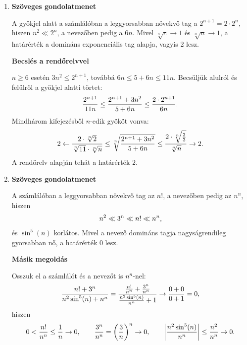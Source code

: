 \documentclass[11pt]{scrartcl}
\begin{document}
\begin{enumerate}
	\item \textbf{Szöveges gondolatmenet}

	      A gyökjel alatt a számlálóban a leggyorsabban növekvő tag a
	      $2^{n + 1} = 2 \cdot 2^n$, hiszen $n^2 \ll 2^n$, a nevezőben pedig a
	      $6n$. Mivel $\sqrt[n]{c} \to 1$ és $\sqrt[n]{n} \to 1$, a határérték a
	      domináns exponenciális tag alapja, vagyis $2$ lesz.

	      \textbf{Becslés a rendőrelvvel}

	      $n \ge 6$ esetén $3n^2 \le 2^{n + 1}$, továbbá
	      $6n \le 5 + 6n \le 11n$. Becsüljük alulról és felülről a gyökjel
	      alatti törtet:
	      \[
		      \frac{2^{n + 1}}{11n}
		      \le \frac{2^{n + 1} + 3n^2}{5 + 6n}
		      \le \frac{2 \cdot 2^{n + 1}}{6n}
		      \text.
	      \]
	      Mindhárom kifejezésből $n$-edik gyököt vonva:
	      \[
		      2
		      \leftarrow \frac{2 \cdot \sqrt[n]{2}}{\sqrt[n]{11} \cdot \sqrt[n]{n}}
		      \le \sqrt[n]{\frac{2^{n + 1} + 3n^2}{5 + 6n}}
		      \le \frac{2 \cdot \sqrt[n]{\frac{2}{3}}}{\sqrt[n]{n}}
		      \to 2
		      \text.
	      \]
	      A rendőrelv alapján tehát a határérték $2$.

	\item \textbf{Szöveges gondolatmenet}

	      A számlálóban a leggyorsabban növekvő tag az $n!$, a nevezőben pedig
	      az $n^n$, hiszen
	      \[
		      n^2 \ll 3^n \ll n! \ll n^n
		      \text,
	      \]
	      és $\sin^5(n)$ korlátos. Mivel a nevező domináns tagja nagyságrendileg
	      gyorsabban nő, a határérték $0$ lesz.

	      \textbf{Másik megoldás}

	      Osszuk el a számlálót és a nevezőt is $n^n$-nel:
	      \[
		      \frac{n! + 3^n}{n^2 \sin^5(n) + n^n}
		      = \frac{
			      \frac{n!}{n^n} + \frac{3^n}{n^n}
		      }{
			      \frac{n^2 \sin^5(n)}{n^n} + 1
		      }
		      \to \frac{0 + 0}{0 + 1} = 0
		      \text,
	      \]
	      hiszen
	      \[
		      0 < \frac{n!}{n^n} \le \frac{1}{n} \to 0,
		      \qquad
		      \frac{3^n}{n^n} = \left( \frac{3}{n} \right)^n \to 0,
		      \qquad
		      \left| \frac{n^2 \sin^5(n)}{n^n} \right| \le \frac{n^2}{n^n} \to 0
		      \text.
	      \]
\end{enumerate}
\end{document}
